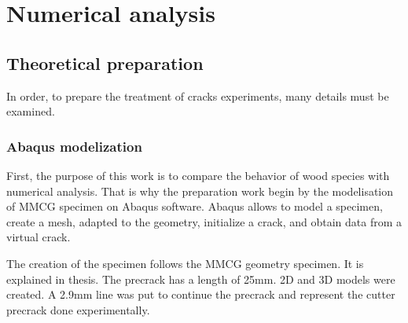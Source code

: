 
\chapter{Numerical analysis} %
\label{NumAnalysis} %


\section{Theoretical preparation}

In order, to prepare the treatment of cracks experiments, many details must be examined.

\subsection{Abaqus modelization}

First, the purpose of this work is to compare the behavior of wood species with numerical analysis. That is why the preparation work begin by the modelisation of MMCG specimen on Abaqus software. Abaqus allows to model a specimen, create a mesh, adapted to the geometry, initialize a crack, and obtain data from a virtual crack.

The creation of the specimen follows the MMCG geometry specimen. It is explained in \parencite{Reference7} thesis. The precrack has a length of 25mm. 2D and 3D models were created. A 2.9mm line was put to continue the precrack and represent the cutter precrack done experimentally.

